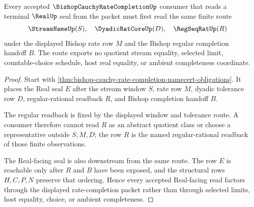 \begin{theorem}
\label{thm:bishop-cauchy-rate-completion-regular-readback}
Every accepted $\BishopCauchyRateCompletionUp$ consumer that reads a terminal $\RealUp$ seal from the packet must first read the same finite route
$$
\StreamNameUp(S),\quad \DyadicRatCoreUp(D),\quad \RegSeqRatUp(R)
$$
under the displayed Bishop rate row $M$ and the Bishop regular completion handoff $B$. The route exports no quotient stream equality, selected limit, countable-choice schedule, host real equality, or ambient completeness coordinate.
\end{theorem}
\begin{proof}
Start with \autoref{thm:bishop-cauchy-rate-completion-namecert-obligations}. It places the Real seal $E$ after the stream window $S$, rate row $M$, dyadic tolerance row $D$, regular-rational readback $R$, and Bishop completion handoff $B$.

The regular readback is fixed by the displayed window and tolerance route. A consumer therefore cannot read $R$ as an abstract quotient class or choose a representative outside $S,M,D$; the row $R$ is the named regular-rational readback of those finite observations.

The Real-facing seal is also downstream from the same route. The row $E$ is reachable only after $R$ and $B$ have been exposed, and the structural rows $H,C,P,N$ preserve that ordering. Hence every accepted Real-facing read factors through the displayed rate-completion packet rather than through selected limits, host equality, choice, or ambient completeness.
\end{proof}




